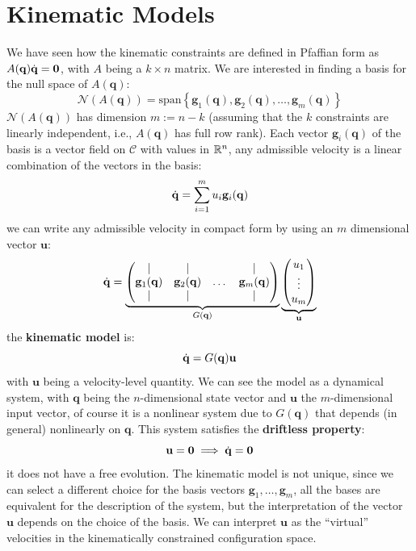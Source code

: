 \documentclass[10pt, a4paper]{report}
\newcommand{\q}{{\mathbf q}}
\begin{document}
\section{Kinematic Models}
We have seen how  the kinematic constraints are defined in Pfaffian form as $A(\q)\dq=\mathbf 0$, with $A$ being a $k\times n$ matrix. We are interested in finding a basis for the null space of $A(\q)$:\begin{equation}
    \mathcal N(A(\q))=\text{span}\left\{ 
        \mathbf g_1(\q),\mathbf g_2(\q),\dots,\mathbf g_m(\q)
    \right\}
\end{equation}
$\mathcal N(A(\q))$ has dimension $m:=n-k$ (assuming that the $k$ constraints are linearly independent, i.e., $A(\q)$ has full row rank). Each vector $\mathbf g_i(\q)$ of the basis is a vector field on $\mathcal C$ with values in ${\mathbb R}^n$, any admissible velocity is a linear combination of the vectors in the basis:\begin{equation}
    \dq=\sum_{i=1}^m u_i\mathbf g_i(\q)
\end{equation}
we can write any admissible velocity in compact form by using an $m$ dimensional vector $\mathbf u$:\begin{equation}
    \dq=\underbrace{\begin{pmatrix}
        | &|&&|\\
        \mathbf g_1(\q)&\mathbf g_2(\q)&\dots&\mathbf g_m(\q)\\
        | &|&&|
    \end{pmatrix}}_{G(\q)}\underbrace{\begin{pmatrix}
    u_1\\ \vdots\\ u_m
    \end{pmatrix}}_{\mathbf u}
\end{equation}
the \textbf{kinematic model} is:\begin{equation}
    \dq=G(\q)\mathbf u
\end{equation}
with $\mathbf u$ being a velocity-level quantity. We can see the model as a dynamical system, with $\q$ being the $n$-dimensional state vector and $\mathbf u$ the $m$-dimensional input vector, of course it is a nonlinear system due to $G(\q)$ that depends (in general) nonlinearly on $\q$.
This system satisfies the \textbf{driftless property}:\begin{equation}
    \mathbf u = \mathbf 0 \implies {\dot{\mathbf q}}=\mathbf 0
\end{equation}
it does not have a free evolution. The kinematic model is not unique, since we can select a different choice for the basis vectors $\mathbf g_1,\dots, \mathbf g_m$, all the bases are equivalent for the description of the system, but the interpretation of the vector $\mathbf u$ depends on the choice of the basis. We can interpret $\mathbf u$ as the ``virtual'' velocities in the kinematically constrained configuration space.\bigskip
\end{document}
